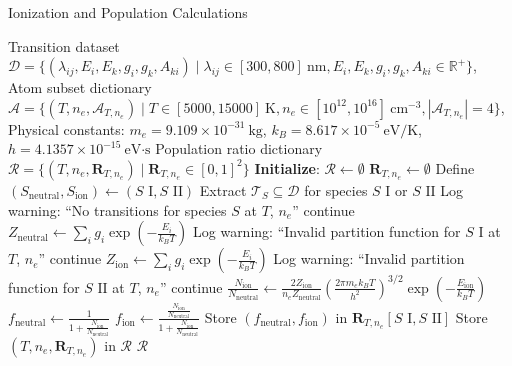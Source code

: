 \begin{algorithm}
\small
\caption{Ionization and Population Calculations}
\begin{algorithmic}[1]
  \REQUIRE
    Transition dataset $\mathcal{D} = \{ (\lambda_{ij}, E_i, E_k, g_i, g_k, A_{ki}) \mid \lambda_{ij} \in [300, 800]~\text{nm}, E_i, E_k, g_i, g_k, A_{ki} \in \mathbb{R}^+ \}$, \\
    Atom subset dictionary $\mathcal{A} = \{ (T, n_e, \mathcal{A}_{T,n_e}) \mid T \in [5000, 15000]~\text{K}, n_e \in [10^{12}, 10^{16}]~\text{cm}^{-3}, |\mathcal{A}_{T,n_e}| = 4 \}$, \\
    Physical constants: $m_e = 9.109 \times 10^{-31}~\text{kg}$, $k_B = 8.617 \times 10^{-5}~\text{eV/K}$, $h = 4.1357 \times 10^{-15}~\text{eV·s}$
  \ENSURE
    Population ratio dictionary $\mathcal{R} = \{ (T, n_e, \mathbf{R}_{T,n_e}) \mid \mathbf{R}_{T,n_e} \in [0, 1]^2 \}$
  \STATE \textbf{Initialize}: $\mathcal{R} \gets \emptyset$
    \STATE $\mathbf{R}_{T,n_e} \gets \emptyset$
      \STATE Define $(S_{\text{neutral}}, S_{\text{ion}}) \gets (S \text{ I}, S \text{ II})$
      \STATE Extract $\mathcal{T}_S \subseteq \mathcal{D}$ for species $S \text{ I}$ or $S \text{ II}$
        \STATE Log warning: ``No transitions for species $S$ at $T$, $n_e$'' 
        \STATE continue
      \ENDIF
      \STATE $Z_{\text{neutral}} \gets \sum_i g_i \exp\left(-\frac{E_i}{k_B T}\right)$
        \STATE Log warning: ``Invalid partition function for $S \text{ I}$ at $T$, $n_e$'' 
        \STATE continue
      \ENDIF
      \STATE $Z_{\text{ion}} \gets \sum_i g_i \exp\left(-\frac{E_i}{k_B T}\right)$
        \STATE Log warning: ``Invalid partition function for $S \text{ II}$ at $T$, $n_e$'' 
        \STATE continue
      \ENDIF
      \STATE $\frac{N_{\text{ion}}}{N_{\text{neutral}}} \gets \frac{2 Z_{\text{ion}}}{n_e Z_{\text{neutral}}} \left( \frac{2\pi m_e k_B T}{h^2} \right)^{3/2} \exp\left(-\frac{E_{\text{ion}}}{k_B T}\right)$
      \STATE $f_{\text{neutral}} \gets \frac{1}{1 + \frac{N_{\text{ion}}}{N_{\text{neutral}}}}$
      \STATE $f_{\text{ion}} \gets \frac{\frac{N_{\text{ion}}}{N_{\text{neutral}}}}{1 + \frac{N_{\text{ion}}}{N_{\text{neutral}}}}$
      \STATE Store $(f_{\text{neutral}}, f_{\text{ion}})$ in $\mathbf{R}_{T,n_e}[S \text{ I}, S \text{ II}]$
    \ENDFOR
    \STATE Store $(T, n_e, \mathbf{R}_{T,n_e})$ in $\mathcal{R}$
  \ENDFOR
  \STATE \RETURN $\mathcal{R}$
\end{algorithmic}
\end{algorithm}
